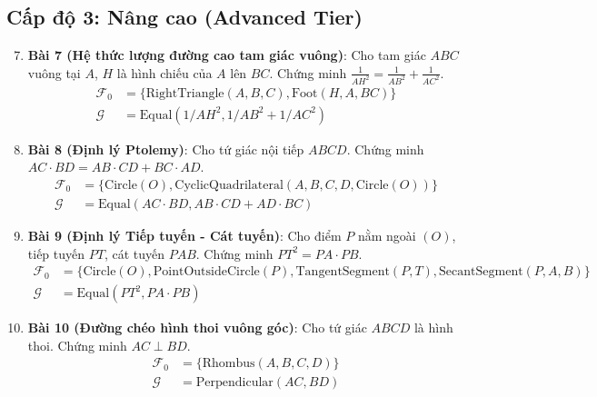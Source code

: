 \subsection*{Cấp độ 3: Nâng cao (Advanced Tier)}
\begin{enumerate}
    \setcounter{enumi}{6}
    \item \textbf{Bài 7 (Hệ thức lượng đường cao tam giác vuông)}: Cho tam giác $ABC$ vuông tại $A$, $H$ là hình chiếu của $A$ lên $BC$. Chứng minh $\frac{1}{AH^2} = \frac{1}{AB^2} + \frac{1}{AC^2}$.
    \begin{align*}
        \mathcal{F}_0 &= \{\text{RightTriangle}(A,B,C), \text{Foot}(H,A,BC)\} \\
        \mathcal{G} &= \text{Equal}(1/AH^2, 1/AB^2 + 1/AC^2)
    \end{align*}

    \item \textbf{Bài 8 (Định lý Ptolemy)}: Cho tứ giác nội tiếp $ABCD$. Chứng minh $AC \cdot BD = AB \cdot CD + BC \cdot AD$.
    \begin{align*}
        \mathcal{F}_0 &= \{\text{Circle}(O), \text{CyclicQuadrilateral}(A,B,C,D,\text{Circle}(O))\} \\
        \mathcal{G} &= \text{Equal}(AC \cdot BD, AB \cdot CD + AD \cdot BC)
    \end{align*}

    \item \textbf{Bài 9 (Định lý Tiếp tuyến - Cát tuyến)}: Cho điểm $P$ nằm ngoài $(O)$, tiếp tuyến $PT$, cát tuyến $PAB$. Chứng minh $PT^2 = PA \cdot PB$.
    \begin{align*}
        \mathcal{F}_0 &= \{\text{Circle}(O), \text{PointOutsideCircle}(P), \text{TangentSegment}(P,T), \text{SecantSegment}(P,A,B)\} \\
        \mathcal{G} &= \text{Equal}(PT^2, PA \cdot PB)
    \end{align*}

    \item \textbf{Bài 10 (Đường chéo hình thoi vuông góc)}: Cho tứ giác $ABCD$ là hình thoi. Chứng minh $AC \perp BD$.
    \begin{align*}
        \mathcal{F}_0 &= \{\text{Rhombus}(A,B,C,D)\} \\
        \mathcal{G} &= \text{Perpendicular}(AC, BD)
    \end{align*}
\end{enumerate}

